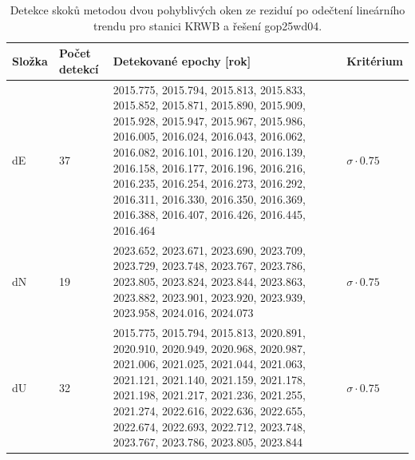 \begin{table}[htbp]
\caption{Detekce skoků metodou dvou pohyblivých oken ze reziduí po odečtení lineárního trendu pro stanici KRWB a řešení gop25wd04.}
\label{tab:gop25wd04_stcd_krwb_detr_weighted_1seg_jumps_sliding_window}
\begin{tabular}{llll}
\toprule
Složka & Počet detekcí & Detekované epochy [rok] & Kritérium \\
\midrule
dE & 37 & 2015.775, 2015.794, 2015.813, 2015.833, 2015.852, 2015.871, 2015.890, 2015.909, 2015.928, 2015.947, 2015.967, 2015.986, 2016.005, 2016.024, 2016.043, 2016.062, 2016.082, 2016.101, 2016.120, 2016.139, 2016.158, 2016.177, 2016.196, 2016.216, 2016.235, 2016.254, 2016.273, 2016.292, 2016.311, 2016.330, 2016.350, 2016.369, 2016.388, 2016.407, 2016.426, 2016.445, 2016.464 & $\sigma \cdot 0.75$ \\
dN & 19 & 2023.652, 2023.671, 2023.690, 2023.709, 2023.729, 2023.748, 2023.767, 2023.786, 2023.805, 2023.824, 2023.844, 2023.863, 2023.882, 2023.901, 2023.920, 2023.939, 2023.958, 2024.016, 2024.073 & $\sigma \cdot 0.75$ \\
dU & 32 & 2015.775, 2015.794, 2015.813, 2020.891, 2020.910, 2020.949, 2020.968, 2020.987, 2021.006, 2021.025, 2021.044, 2021.063, 2021.121, 2021.140, 2021.159, 2021.178, 2021.198, 2021.217, 2021.236, 2021.255, 2021.274, 2022.616, 2022.636, 2022.655, 2022.674, 2022.693, 2022.712, 2023.748, 2023.767, 2023.786, 2023.805, 2023.844 & $\sigma \cdot 0.75$ \\
\bottomrule
\end{tabular}
\end{table}
